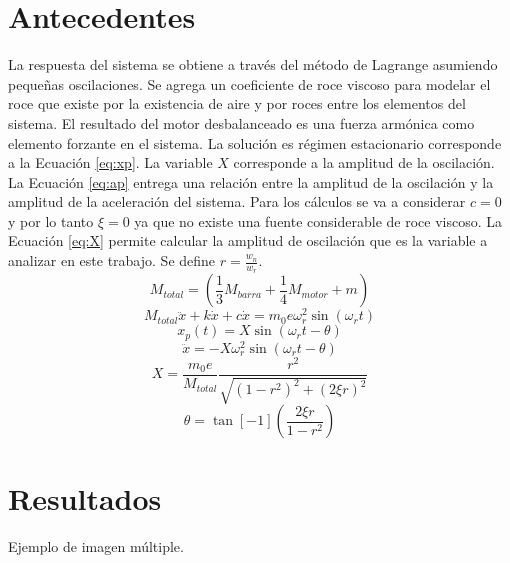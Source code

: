 \documentclass[letterpaper,11pt]{article} %
\begin{document}
\section{Antecedentes}
La respuesta del sistema se obtiene a través del método de Lagrange asumiendo pequeñas oscilaciones. Se agrega un coeficiente de roce viscoso para modelar el roce que existe por la existencia de aire y por roces entre los elementos del sistema. El resultado del motor desbalanceado es una fuerza armónica como elemento forzante en el sistema. 
La solución es régimen estacionario corresponde a la Ecuación \ref{eq:xp}. La variable $X$ corresponde a la amplitud de la oscilación. La Ecuación \ref{eq:ap} entrega una relación entre la amplitud de la oscilación y la amplitud de la aceleración del sistema.
Para los cálculos se va a considerar $c=0$ y por lo tanto $\xi=0$ ya que no existe una fuente considerable de roce viscoso.  La Ecuación \ref{eq:X} permite calcular la amplitud de oscilación que es la variable a analizar en este trabajo.  Se define $r=\frac{w_n}{w_r}$.
\begin{equation}
M_{total} =\left(\frac{1}{3}M_{barra}+\frac{1}{4}M_{motor}+m\right)
\label{eq:respuesta}
\end{equation}
\begin{equation}
    M_{total}\ddot{x} + k\dot{x} + c\dot{x}= m_{0}e\omega_{r}^2\sin(\omega_{r}t)
    \label{eq:mtotal}
\end{equation}
\begin{equation}
x_p(t)=X\sin(\omega_rt-\theta)
\label{eq:xp}	
\end{equation}
\begin{equation}
\ddot{x}=-X\omega_{r}^2\sin(\omega_rt-\theta)
\label{eq:ap}
\end{equation}
\begin{equation}
	X = \frac{m_{0}e}{M_{total}}\frac{r^2}{\sqrt{(1-r^2)^2+(2\xi r)^2}}
	\label{eq:X}
\end{equation}
\begin{equation}
	\theta = \tan[-1](\frac{2\xi r}{1-r^2})
	\label{eq:teta}
\end{equation}
\section{Resultados}
\begin{images}[\label{imagenmultiple}]{Ejemplo de imagen múltiple.}
\end{images}
\end{document}
